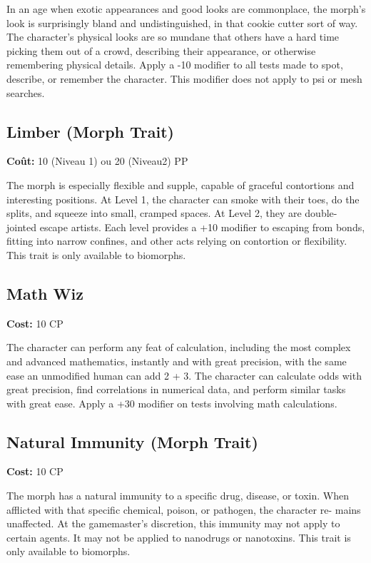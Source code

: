 In an age when exotic appearances and good looks are commonplace, the morph’s look is surprisingly bland and undistinguished, in that cookie cutter sort of way. The character’s physical looks are so mundane that others have a hard time picking them out of a crowd, describing their appearance, or otherwise remembering physical details. Apply a -10 modifier to all tests made to spot, describe, or remember the character. This modifier does not apply to psi or mesh searches. 

\subsection{Limber (Morph Trait)} \label{sec:traits-limber} 

\textbf{Coût:} 10 (Niveau 1) ou 20 (Niveau2) PP 

The morph is especially flexible and supple, capable of graceful contortions and interesting positions. At Level 1, the character can smoke with their toes, do the splits, and squeeze into small, cramped spaces. At Level 2, they are double-jointed escape artists. Each level provides a +10 modifier to escaping from bonds, fitting into narrow confines, and other acts relying on contortion or flexibility. This trait is only available to biomorphs. 

\subsection{Math Wiz} \label{sec:traits-mathwiz} \textbf{Cost:} 10 CP 

The character can perform any feat of calculation, including the most complex and advanced mathematics, instantly and with great precision, with the same ease an unmodified human can add 2 + 3. The character can calculate odds with great precision, find correlations in numerical data, and perform similar tasks with great ease. Apply a +30 modifier on tests involving math calculations. 

\subsection{Natural Immunity (Morph Trait)} \label{sec:traits-natural-immunity} 

\textbf{Cost:} 10 CP 

The morph has a natural immunity to a specific drug, disease, or toxin. When afflicted with that specific chemical, poison, or pathogen, the character re- mains unaffected. At the gamemaster’s discretion, this immunity may not apply to certain agents. It may not be applied to nanodrugs or nanotoxins. This trait is only available to biomorphs. 

